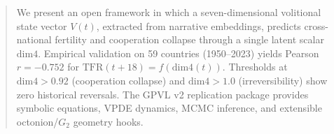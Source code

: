 \begin{abstract}
We present an open framework in which a seven-dimensional volitional state
vector $V(t)$, extracted from narrative embeddings, predicts cross-national
fertility and cooperation collapse through a single latent scalar $\mathrm{dim4}$.
Empirical validation on 59 countries (1950--2023) yields Pearson
$r = -0.752$ for $\mathrm{TFR}(t{+}18) = f(\mathrm{dim4}(t))$.
Thresholds at $\mathrm{dim4} > 0.92$ (cooperation collapse) and
$\mathrm{dim4} > 1.0$ (irreversibility) show zero historical reversals.
The GPVL v2 replication package provides symbolic equations, VPDE dynamics,
MCMC inference, and extensible octonion/$G_2$ geometry hooks.
\end{abstract}